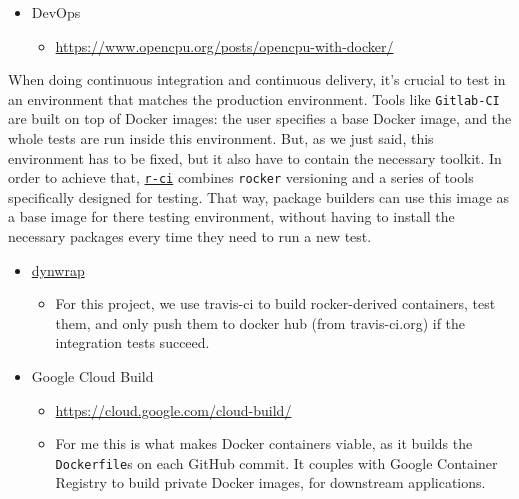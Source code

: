 \begin{itemize}
\tightlist
\item
  DevOps

  \begin{itemize}
  \tightlist
  \item
    \url{https://www.opencpu.org/posts/opencpu-with-docker/}
  \end{itemize}
\end{itemize}

When doing continuous integration and continuous delivery, it's crucial
to test in an environment that matches the production environment. Tools
like \texttt{Gitlab-CI} are built on top of Docker images: the user
specifies a base Docker image, and the whole tests are run inside this
environment. But, as we just said, this environment has to be fixed, but
it also have to contain the necessary toolkit. In order to achieve that,
\href{https://github.com/ColinFay/r-ci}{\texttt{r-ci}} combines
\texttt{rocker} versioning and a series of tools specifically designed
for testing. That way, package builders can use this image as a base
image for there testing environment, without having to install the
necessary packages every time they need to run a new test.

\begin{itemize}
\tightlist
\item
  \href{https://github.com/dynverse/dynwrap_containers/blob/master/.travis.yml}{dynwrap}
  \citep{rcannood}

  \begin{itemize}
  \tightlist
  \item
    For this project, we use travis-ci to build rocker-derived
    containers, test them, and only push them to docker hub (from
    travis-ci.org) if the integration tests succeed.
  \end{itemize}
\item
  Google Cloud Build \citep{MarkEdmondson1234}

  \begin{itemize}
  \tightlist
  \item
    \url{https://cloud.google.com/cloud-build/}
  \item
    For me this is what makes Docker containers viable, as it builds the
    \texttt{Dockerfile}s on each GitHub commit. It couples with Google
    Container Registry to build private Docker images, for downstream
    applications.
  \end{itemize}
\end{itemize}

